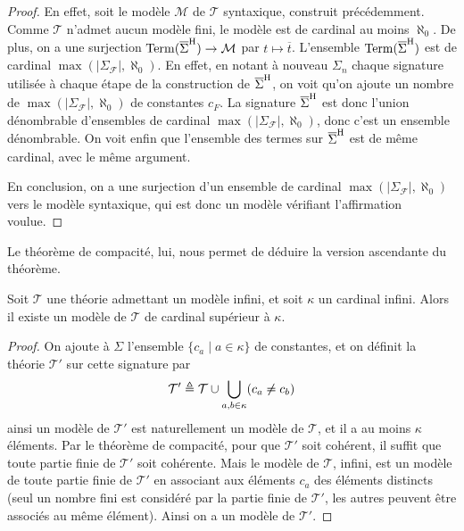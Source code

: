 \begin{proof}
  En effet, soit le modèle $\mathcal M$ de $\mathcal T$ syntaxique, construit
  précédemment. Comme $\mathcal T$ n'admet aucun modèle fini, le modèle est de
  cardinal au moins $\aleph_0$. De plus, on a une surjection
  $\operatorname{Term}(\overline{\Sigma}^{\mathrm H}) \to \mathcal M$ par $t\mapsto \overline t$. L'ensemble
  $\operatorname{Term}(\overline{\Sigma}^{\mathrm H})$ est de cardinal $\max(|\Sigma_{\mathcal F}|,\aleph_0)$.
  En effet, en notant à nouveau $\Sigma_n$ chaque signature utilisée à chaque
  étape de la construction de $\overline{\Sigma}^{\mathrm H}$, on voit qu'on ajoute un nombre
  de $\max(|\Sigma_\mathcal F|,\aleph_0)$ de constantes $c_F$. La signature
  $\overline{\Sigma}^{\mathrm H}$ est donc l'union dénombrable d'ensembles de cardinal
  $\max(|\Sigma_\mathcal F|,\aleph_0)$, donc c'est un ensemble dénombrable.
  On voit enfin que l'ensemble des termes sur $\overline{\Sigma}^{\mathrm H}$ est de même
  cardinal, avec le même argument.

  En conclusion, on a une surjection d'un ensemble de cardinal
  $\max(|\Sigma_\mathcal F|,\aleph_0)$ vers le modèle syntaxique, qui est donc
  un modèle vérifiant l'affirmation voulue.
\end{proof}

Le théorème de compacité, lui, nous permet de déduire la version ascendante du
théorème.

\begin{theorem}
  Soit $\mathcal T$ une théorie admettant un modèle infini, et
  soit $\kappa$ un cardinal infini. Alors il existe un modèle
  de $\mathcal T$ de cardinal supérieur à $\kappa$.
\end{theorem}

\begin{proof}
  On ajoute à $\Sigma$ l'ensemble $\{c_a\mid a \in \kappa\}$ de constantes, et
  on définit la théorie $\mathcal T'$ sur cette signature par
  \[\mathcal T'\triangleq\mathcal T\cup \bigcup_{a,b\in \kappa}(c_a\neq c_b)\]
  ainsi un modèle de $\mathcal T'$ est naturellement un modèle de $\mathcal T$,
  et il a au moins $\kappa$ éléments. Par le théorème de compacité, pour
  que $\mathcal T'$ soit cohérent, il suffit que toute partie finie de
  $\mathcal T'$ soit cohérente. Mais le modèle de $\mathcal T$, infini, est
  un modèle de toute partie finie de $\mathcal T'$ en associant aux éléments
  $c_a$ des éléments distincts (seul un nombre fini est considéré par la partie
  finie de $\mathcal T'$, les autres peuvent être associés au même élément). Ainsi
  on a un modèle de $\mathcal T'$.
\end{proof}

